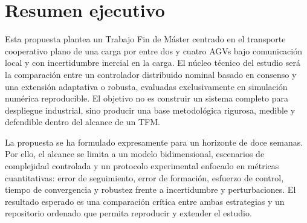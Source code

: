 \section*{Resumen ejecutivo}

Esta propuesta plantea un Trabajo Fin de Máster centrado en el transporte cooperativo plano de una carga por entre dos y cuatro AGVs bajo comunicación local y con incertidumbre inercial en la carga. El núcleo técnico del estudio será la comparación entre un controlador distribuido nominal basado en consenso y una extensión adaptativa o robusta, evaluadas exclusivamente en simulación numérica reproducible. El objetivo no es construir un sistema completo para despliegue industrial, sino producir una base metodológica rigurosa, medible y defendible dentro del alcance de un TFM.

La propuesta se ha formulado expresamente para un horizonte de doce semanas. Por ello, el alcance se limita a un modelo bidimensional, escenarios de complejidad controlada y un protocolo experimental enfocado en métricas cuantitativas: error de seguimiento, error de formación, esfuerzo de control, tiempo de convergencia y robustez frente a incertidumbre y perturbaciones. El resultado esperado es una comparación crítica entre ambas estrategias y un repositorio ordenado que permita reproducir y extender el estudio.
